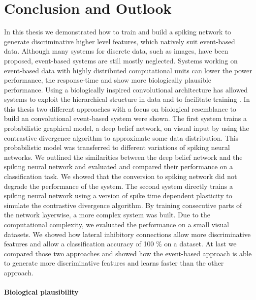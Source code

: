 \chapter{Conclusion and Outlook} \label{c:conclusion}

In this thesis we demonstrated how to train and build a spiking network to generate discriminative higher level features, which natively suit event-based data.
Although many systems for discrete data, such as images, have been proposed, event-based systems are still mostly neglected.
Systems working on event-based data with highly distributed computational units can lower the power performance, the response-time and show more biologically plausible performance.  
Using a biologically inspired convolutional architecture has allowed systems to exploit the hierarchical structure in data and to facilitate training \cite{NIPS2012_4824}.
In this thesis two different approaches with a focus on biological resemblance to build an convolutional event-based system were shown.
The first system trains a probabilistic graphical model, a deep belief network, on visual input by using the contrastive divergence algorithm to approximate some data distribution.
This probabilistic model was transferred to different variations of spiking neural networks.
We outlined the similarities between the deep belief network and the spiking neural network and evaluated and compared their performance on a classification task. 
We showed that the conversion to spiking network did not degrade the performance of the system. 
The second system directly trains a spiking neural network using a version of spike time dependent plasticity to simulate the contrastive divergence algorithm. By training consecutive parts of the network layerwise, a more complex system was built. Due to the computational complexity, we evaluated the performance on a small visual datasets. We showed how lateral inhibitory connections allow more discriminative features and allow a classification accuracy of 100 $\%$ on a dataset.
At last we compared those two approaches and showed how the event-based approach is able to generate more discriminative features and learns faster than the other approach.  

\subsubsection{Biological plausibility} \label{c:bioplau}

